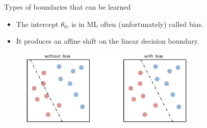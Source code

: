 \begin{frame} {Types of boundaries that can be learned}
\begin{itemize}
  \item The intercept $\theta_0$, is in ML often (unfortunately) called bias.
    \item It produces an affine shift on the linear decision boundary.
  \end{itemize}
    \begin{figure}
      \centering
        \includegraphics[width=8.5cm]{plots/bias.png}
    \end{figure}
\end{frame}

